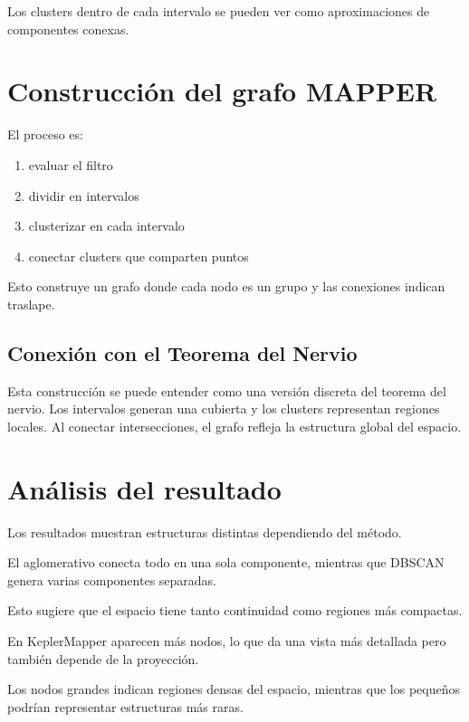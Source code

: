 \documentclass[12pt]{article}
\begin{document}
Los clusters dentro de cada intervalo se pueden ver como aproximaciones de componentes conexas.

\section{Construcci\'on del grafo MAPPER}

El proceso es:

\begin{enumerate}
    \item evaluar el filtro
    \item dividir en intervalos
    \item clusterizar en cada intervalo
    \item conectar clusters que comparten puntos
\end{enumerate}

Esto construye un grafo donde cada nodo es un grupo y las conexiones indican traslape.

\subsection{Conexión con el Teorema del Nervio}

Esta construcción se puede entender como una versión discreta del teorema del nervio. Los intervalos generan una cubierta y los clusters representan regiones locales. Al conectar intersecciones, el grafo refleja la estructura global del espacio.

\section{An\'alisis del resultado}

Los resultados muestran estructuras distintas dependiendo del método.

El aglomerativo conecta todo en una sola componente, mientras que DBSCAN genera varias componentes separadas.

Esto sugiere que el espacio tiene tanto continuidad como regiones más compactas.

En KeplerMapper aparecen más nodos, lo que da una vista más detallada pero también depende de la proyección.

Los nodos grandes indican regiones densas del espacio, mientras que los pequeños podrían representar estructuras más raras.

\end{document}
